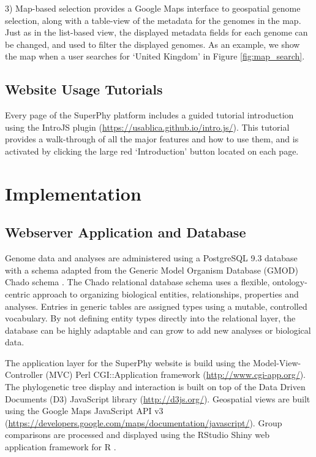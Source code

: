 \documentclass[doublespacing, linenumbers]{bmcart}
\begin{document}
 3) Map-based selection provides a Google Maps interface to geospatial genome selection, along with a table-view of the metadata for the genomes in the map. Just as in the list-based view, the displayed metadata fields for each genome can be changed, and used to filter the displayed genomes. As an example, we show the map when a user searches for `United Kingdom' in Figure \ref{fig:map_search}.

\subsection{Website Usage Tutorials}
Every page of the SuperPhy platform includes a guided tutorial  introduction using the IntroJS plugin (\url{https://usablica.github.io/intro.js/}). This tutorial provides a walk-through of all the major features and how to use them, and is activated by clicking the large red `Introduction' button located on each page.

\section{Implementation}
\subsection{Webserver Application and Database}

Genome data and analyses are administered using a PostgreSQL 9.3 database with a schema adapted from the Generic Model Organism Database (GMOD) Chado schema \cite{mungall_chado_2007}. The Chado relational database schema uses a flexible, ontology-centric approach to organizing biological entities, relationships, properties and analyses. Entries in generic tables are assigned types using a mutable, controlled vocabulary. By not defining entity types directly into the relational layer, the database can be highly adaptable and can grow to add new analyses or biological data.

The application layer for the SuperPhy website is build using the Model-View-Controller (MVC) Perl CGI::Application framework (\url{http://www.cgi-app.org/}). The phylogenetic tree display and interaction is built on top of the Data Driven Documents (D3) JavaScript library (\url{http://d3js.org/}). Geospatial views are built using the Google Maps JavaScript API v3 (\url{https://developers.google.com/maps/documentation/javascript/}). Group comparisons are processed and displayed using the RStudio Shiny web application framework for R \cite{racine_rstudio:_2012}.
\end{document}
